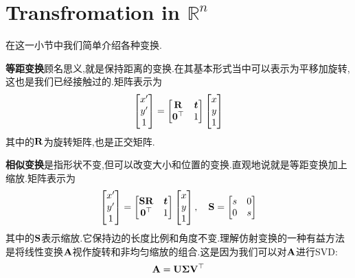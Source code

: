 \chapter{Transfromation in $\mathbb R^n$\label{transformation}}
在这一小节中我们简单介绍各种变换.

\textbf{等距变换}顾名思义,就是保持距离的变换.在其基本形式当中可以表示为平移加旋转,这也是我们已经接触过的.矩阵表示为
\begin{equation}
	\begin{bmatrix}
		x^\prime
		\\
		y^\prime
		\\
		1
	\end{bmatrix} = 
	\begin{bmatrix}
		\bold{R} & \bm t
		\\
		\bm 0^\top & 1
	\end{bmatrix}
	\begin{bmatrix}
		x
		\\
		y\\
		1
	\end{bmatrix}
\end{equation}
其中的$\bold{R}$为旋转矩阵,也是正交矩阵.

\textbf{相似变换}是指形状不变,但可以改变大小和位置的变换.直观地说就是等距变换加上缩放.矩阵表示为
\begin{equation}
	\begin{bmatrix}
		x^\prime
		\\
		y^\prime
		\\
		1
	\end{bmatrix} = 
	\begin{bmatrix}
		\bold{S} \bold{R} & \bm t
		\\
		\bm 0^\top & 1
	\end{bmatrix}
	\begin{bmatrix}
		x
		\\
		y\\
		1
	\end{bmatrix}, \quad \bold{S} = 
	\begin{bmatrix}
		s & 0
		\\ 
		0 & s
	\end{bmatrix}
\end{equation}
其中的$\bold{S}$表示缩放.它保持边的长度比例和角度不变.理解仿射变换的一种有益方法是将线性变换$\bold{A}$视作旋转和非均匀缩放的组合.这是因为我们可以对$\bold{A}$进行SVD:
\begin{equation}
	\bold{A} = \bold{U} \bold{\Sigma} \bold{V}^\top
\end{equation}

